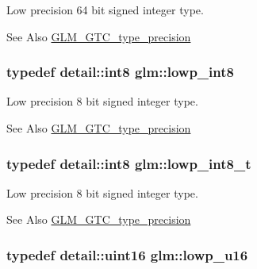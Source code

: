 Low precision 64 bit signed integer type. \begin{DoxySeeAlso}{See Also}
\hyperlink{group__gtc__type__precision}{G\-L\-M\-\_\-\-G\-T\-C\-\_\-type\-\_\-precision} 
\end{DoxySeeAlso}
\hypertarget{group__gtc__type__precision_gaf9e675b6392764242ae87eb179e9d3d6}{
\subsubsection[{lowp\-\_\-int8}]{\setlength{\rightskip}{0pt plus 5cm}typedef detail\-::int8 {\bf glm\-::lowp\-\_\-int8}}}\label{group__gtc__type__precision_gaf9e675b6392764242ae87eb179e9d3d6}
Low precision 8 bit signed integer type. \begin{DoxySeeAlso}{See Also}
\hyperlink{group__gtc__type__precision}{G\-L\-M\-\_\-\-G\-T\-C\-\_\-type\-\_\-precision} 
\end{DoxySeeAlso}
\hypertarget{group__gtc__type__precision_gae6092311f6970a305c2df19a372360a3}{
\subsubsection[{lowp\-\_\-int8\-\_\-t}]{\setlength{\rightskip}{0pt plus 5cm}typedef detail\-::int8 {\bf glm\-::lowp\-\_\-int8\-\_\-t}}}\label{group__gtc__type__precision_gae6092311f6970a305c2df19a372360a3}
Low precision 8 bit signed integer type. \begin{DoxySeeAlso}{See Also}
\hyperlink{group__gtc__type__precision}{G\-L\-M\-\_\-\-G\-T\-C\-\_\-type\-\_\-precision} 
\end{DoxySeeAlso}
\hypertarget{group__gtc__type__precision_ga22c5364f27caa0a6eb0627cbc21e46be}{
\subsubsection[{lowp\-\_\-u16}]{\setlength{\rightskip}{0pt plus 5cm}typedef detail\-::uint16 {\bf glm\-::lowp\-\_\-u16}}}\label{group__gtc__type__precision_ga22c5364f27caa0a6eb0627cbc21e46be}
